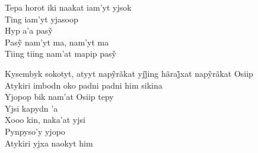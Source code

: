 \begin{linenumbers}\begingroup\raggedright
 
\noindent   Tepa horot iki naakat iam'yt yjsok\\
  Ting iam'yt yjasoop\\
  Hyp a’a pasỹ\\
  Pasỹ nam’yt ma, nam’yt ma\\
  Tiing tiing nam’at mapip pasỹ
 
\end{linenumbers}\endgroup

\bigskip

\begin{linenumbers}\begingroup\raggedright
 
\noindent   Kysembyk sokotyt, atyyt napỹrãkat yjj̃ing hãraj̃xat napỹrãkat Osiip\\
  Atykiri imbodn oko padni padni him sikina\\
  Yjopop bik nam'at Osiip tepy\\
  Yjsi kapydn 'a\\
  Xooo kin, naka'at yjsi\\
  Pynpyso'y yjopo\\
  Atykiri yjxa naokyt him
 
\end{linenumbers}\endgroup

\bigskip


